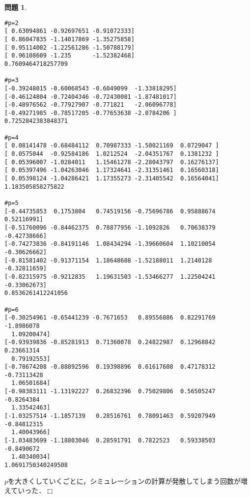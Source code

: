 \documentclass{jsarticle}
\theoremstyle{definition}
\newtheorem{Ex}{問題}
\theoremstyle{mystyle} %
\renewcommand{\footnotesize}{\normalsize}
\def\qed{\hfill$\Box$}
\begin{document}
\begin{Ex}
\begin{lstlisting}[basicstyle = \ttfamily\footnotesize, frame = single]
#p=2
[ 0.63094861 -0.92697651 -0.91072333]
[ 0.86047835 -1.14017869 -1.35275858]
[ 0.95114002 -1.22561286 -1.50788179]
[ 0.96108609 -1.235      -1.52382468]
0.7609464718257709

#p=3
[-0.39248015 -0.60068543 -0.6049099  -1.33818295]
[-0.46124804 -0.72404346 -0.72430081 -1.87481017]
[-0.48976562 -0.77927907 -0.771821   -2.06096778]
[-0.49271985 -0.78517205 -0.77653638 -2.0784206 ]
0.7252842383848371

#p=4
[ 0.08141478 -0.68484112  0.70987333 -1.50021169  0.0729047 ]
[ 0.0575044  -0.92584186  1.0212524  -2.04351767  0.1381232 ]
[ 0.05396007 -1.0284011   1.15461278 -2.28043797  0.16276137]
[ 0.05397496 -1.04263046  1.17324641 -2.31351461  0.16560318]
[ 0.05398124 -1.04286421  1.17355273 -2.31405542  0.16564041]
1.183505858275822

#p=5
[-0.44735853  0.1753804   0.74519156 -0.75696786  0.95888674  0.52116991]
[-0.51760096 -0.84462375  0.78877956 -1.1092826   0.70638379 -0.42738666]
[-0.74273836 -0.84191146  1.08434294 -1.39660604  1.10210054 -0.30626662]
[-0.81581402 -0.91371154  1.18648688 -1.52188011  1.2140128  -0.32811659]
[-0.82315975 -0.9212835   1.19631503 -1.53466277  1.22504241 -0.33062673]
0.8536261412241056

#p=6
[-0.30254961 -0.65441239 -0.7671653   0.89556886  0.82291769 -1.8986078
  1.09200474]
[-0.93939836 -0.85281913  0.71360078  0.24822987  0.12968842  0.23661314
  0.79192553]
[-0.78674208 -0.88892596  0.19398896  0.61617608  0.47178312 -0.73113428
  1.06501684]
[-0.98383111 -1.13192227  0.26832396  0.75029806  0.56505247 -0.8264384
  1.33542463]
[-1.03257514 -1.1857139   0.28516761  0.78091463  0.59207949 -0.84812315
  1.40043966]
[-1.03483699 -1.18803046  0.28591791  0.7822523   0.59338503 -0.8490672
  1.40340034]
1.0691750340249508
\end{lstlisting}
$p$を大きくしていくごとに，シミュレーションの計算が発散してしまう回数が増えていった．\qed\\
\end{Ex}
\end{document}
